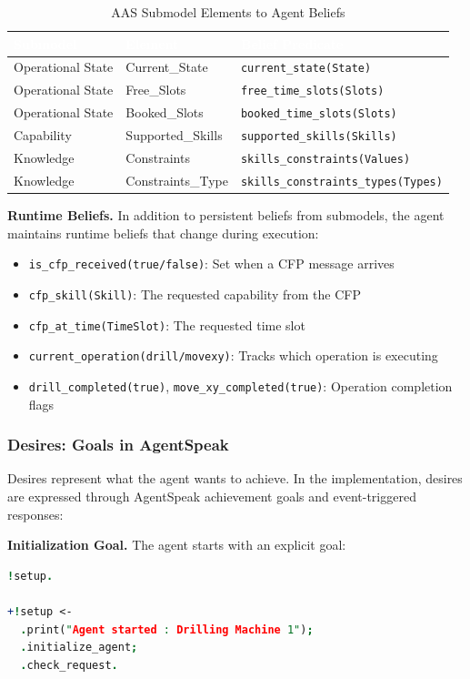 \begin{table}[p]
\centering
\caption{AAS Submodel Elements to Agent Beliefs}
\label{tab:belief_sources}
\begin{tabular}{lll}
\toprule
\rowcolor{headerblue}
\textcolor{white}{Submodel} & \textcolor{white}{Element} & \textcolor{white}{Belief Predicate} \\
\midrule
Operational State & Current\_State & \texttt{current\_state(State)} \\
Operational State & Free\_Slots & \texttt{free\_time\_slots(Slots)} \\
Operational State & Booked\_Slots & \texttt{booked\_time\_slots(Slots)} \\
\rowcolor{lightgray}
Capability & Supported\_Skills & \texttt{supported\_skills(Skills)} \\
\rowcolor{lightgray}
Knowledge & Constraints & \texttt{skills\_constraints(Values)} \\
Knowledge & Constraints\_Type & \texttt{skills\_constraints\_types(Types)} \\
\bottomrule
\end{tabular}
\end{table}
\textbf{Runtime Beliefs.} In addition to persistent beliefs from submodels, the agent maintains runtime beliefs that change during execution:
\begin{itemize}
    \item \texttt{is\_cfp\_received(true/false)}: Set when a CFP message arrives
    \item \texttt{cfp\_skill(Skill)}: The requested capability from the CFP
    \item \texttt{cfp\_at\_time(TimeSlot)}: The requested time slot
    \item \texttt{current\_operation(drill/movexy)}: Tracks which operation is executing
    \item \texttt{drill\_completed(true)}, \texttt{move\_xy\_completed(true)}: Operation completion flags
\end{itemize}

\subsubsection{Desires: Goals in AgentSpeak}

Desires represent what the agent wants to achieve. In the implementation, desires are expressed through AgentSpeak achievement goals and event-triggered responses:

\textbf{Initialization Goal.} The agent starts with an explicit goal:
\begin{lstlisting}[language=Prolog, caption={Initial Goal in AgentSpeak}, label={lst:initial_goal}]
!setup.

+!setup <-
  .print("Agent started : Drilling Machine 1");
  .initialize_agent;
  .check_request.
\end{lstlisting}

